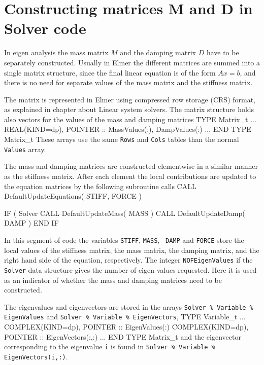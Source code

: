 \sifend


\section{Constructing matrices M and D in Solver code}

In eigen analysis the mass matrix $M$ and the damping matrix $D$ have
to be separately constructed. Usually in Elmer the different matrices
are summed into a single matrix structure, since the final linear
equation is of the form $Ax=b$, and there is no need for separate
values of the mass matrix and the stiffness matrix. 

The matrix is represented in Elmer using compressed row storage (CRS)
format, as explained in chapter about Linear system solvers. The
matrix structure holds also vectors for the values of the mass and
damping matrices
\ttbegin
  TYPE Matrix_t
     ...
    REAL(KIND=dp),  POINTER :: MassValues(:), DampValues(:)
     ...
  END TYPE Matrix_t
\ttend
These arrays use the same {\tt Rows} and {\tt Cols} tables than the
normal {\tt Values} array.

The mass and damping matrices are constructed elementwise in a
similar manner as the stiffness matrix. After each element the local
contributions are updated to the equation matrices by the following
subroutine calls
\ttbegin
  CALL DefaultUpdateEquations( STIFF, FORCE )

  IF ( Solver %
    CALL DefaultUpdateMass( MASS )
    CALL DefaultUpdateDamp( DAMP )
  END IF
\ttend

In this segment of code the variables {\tt STIFF}, {\tt MASS}, {\tt
DAMP} and {\tt FORCE} store the local values of the stiffness matrix,
the mass matrix, the damping matrix, and the right hand side of the
equation, respectively. The integer {\tt NOFEigenValues} if the {\tt
Solver} data structure gives the number of eigen values
requested. Here it is used as an indicator of whether the mass and
damping matrices need to be constructed.

The eigenvalues and eigenvectors are stored in the arrays {\tt Solver
\% Variable \% EigenValues} and {\tt Solver \% Variable \% EigenVectors},
\ttbegin
  TYPE Variable_t
     ...
    COMPLEX(KIND=dp), POINTER :: EigenValues(:)
    COMPLEX(KIND=dp), POINTER :: EigenVectors(:,:)
     ...
  END TYPE Matrix_t
\ttend
and the eigenvector corresponding to the eigenvalue {\tt i}
is found in {\tt Solver \% Variable \% EigenVectors(i,:)}.




